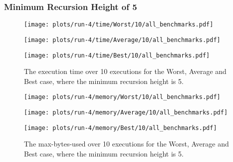 \subsubsection{Minimum Recursion Height of 5}
\begin{figure}[H]
  \begin{minipage}{.5\textwidth}
    \centering
    \texttt{[image: plots/run-4/time/Worst/10/all\_benchmarks.pdf]}  
  \end{minipage}
  \begin{minipage}{.5\textwidth}
    \centering
    \texttt{[image: plots/run-4/time/Average/10/all\_benchmarks.pdf]}  
  \end{minipage}
  \begin{center}
    \begin{minipage}[c]{.5\textwidth}
      \centering
      \texttt{[image: plots/run-4/time/Best/10/all\_benchmarks.pdf]}  
    \end{minipage}
  \end{center}
  \caption{The execution time over 10 executions for the Worst, Average and Best case, where the minimum recursion height is 5.}
\end{figure}
\begin{figure}[H]
  \begin{minipage}{.5\textwidth}
    \centering
    \texttt{[image: plots/run-4/memory/Worst/10/all\_benchmarks.pdf]}  
  \end{minipage}
  \begin{minipage}{.5\textwidth}
    \centering
    \texttt{[image: plots/run-4/memory/Average/10/all\_benchmarks.pdf]}  
  \end{minipage}
  \begin{center}
    \begin{minipage}[c]{.5\textwidth}
      \centering
      \texttt{[image: plots/run-4/memory/Best/10/all\_benchmarks.pdf]}  
    \end{minipage}
  \end{center}
  \caption{The max-bytes-used over 10 executions for the Worst, Average and Best case, where the minimum recursion height is 5.}
\end{figure}

